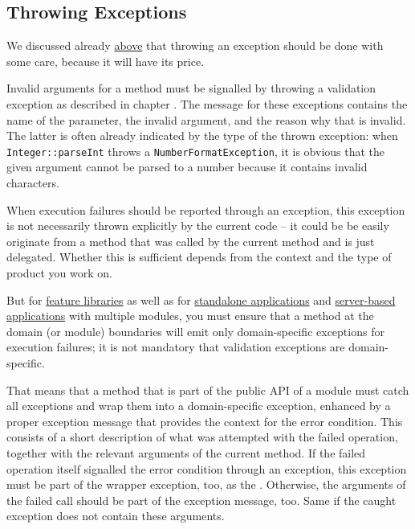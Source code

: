 
\subsection{Throwing Exceptions}\label{sec:ThrowingExceptions}
We discussed already \hyperref[sec:ExceptionCosts]{above} that throwing an exception should be done with some care, because it will have its price.

Invalid arguments for a method must be signalled by throwing a validation exception as described in chapter . The message for these exceptions contains the name of the parameter, the invalid argument, and the reason why that is invalid. The latter is often already indicated by the type of the thrown exception: when \lstinline|Integer::parseInt| throws a \lstinline|NumberFormatException|, it is obvious that the given argument cannot be parsed to a number because it contains invalid characters.

When execution failures should be reported through an exception, this exception is not necessarily thrown explicitly by the current code – it could be be easily originate from a method that was called by the current method and is just delegated. Whether this is sufficient depends from the context and the type of product you work on.

But for \hyperref[sec:FeatureLibrary]{feature libraries} as well as for \hyperref[sec:StandaloneApplication]{standalone applications} and \hyperref[sec:ServerbasedApplication]{server-based applications} with multiple modules, you must ensure that a method at the domain (or module) boundaries will emit only domain-specific exceptions for execution failures; it is not mandatory that validation exceptions are domain-specific.

That means that a method that is part of the public API of a module must catch all exceptions and wrap them into a domain-specific exception, enhanced by a proper exception message that provides the  context for the error condition. This consists of a short description of what was attempted with the failed operation, together with the relevant arguments of the current method. If the failed operation itself signalled the error condition through an exception, this exception must be part of the wrapper exception, too, as the . Otherwise, the arguments of the failed call should be part of the exception message, too. Same if the caught exception does not contain these arguments.

